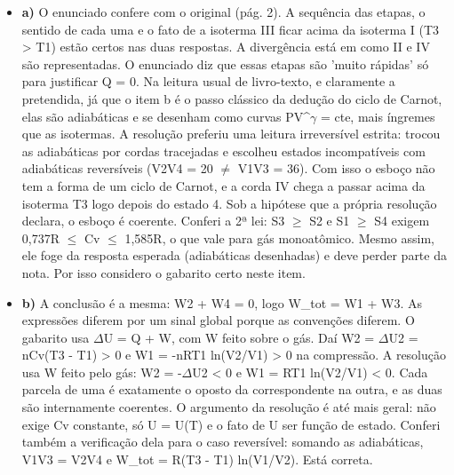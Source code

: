 \documentclass{article}%
\begin{document}
\begin{itemize}%
\item%
\textbf{a)} O enunciado confere com o original (pág. 2). A sequência das etapas, o sentido de cada uma e o fato de a isoterma III ficar acima da isoterma I (T3 > T1) estão certos nas duas respostas. A divergência está em como II e IV são representadas. O enunciado diz que essas etapas são 'muito rápidas' só para justificar Q = 0. Na leitura usual de livro{-}texto, e claramente a pretendida, já que o item b é o passo clássico da dedução do ciclo de Carnot, elas são adiabáticas e se desenham como curvas PV\^{}$\gamma$ = cte, mais íngremes que as isotermas. A resolução preferiu uma leitura irreversível estrita: trocou as adiabáticas por cordas tracejadas e escolheu estados incompatíveis com adiabáticas reversíveis (V2V4 = 20 $\neq$ V1V3 = 36). Com isso o esboço não tem a forma de um ciclo de Carnot, e a corda IV chega a passar acima da isoterma T3 logo depois do estado 4. Sob a hipótese que a própria resolução declara, o esboço é coerente. Conferi a 2ª lei: S3 $\geq$ S2 e S1 $\geq$ S4 exigem 0,737R $\leq$ Cv $\leq$ 1,585R, o que vale para gás monoatômico. Mesmo assim, ele foge da resposta esperada (adiabáticas desenhadas) e deve perder parte da nota. Por isso considero o gabarito certo neste item.%
\item%
\textbf{b)} A conclusão é a mesma: W2 + W4 = 0, logo W\_tot = W1 + W3. As expressões diferem por um sinal global porque as convenções diferem. O gabarito usa $\Delta$U = Q + W, com W feito sobre o gás. Daí W2 = $\Delta$U2 = nCv(T3 - T1) > 0 e W1 = -nRT1 ln(V2/V1) > 0 na compressão. A resolução usa W feito pelo gás: W2 = -$\Delta$U2 < 0 e W1 = RT1 ln(V2/V1) < 0. Cada parcela de uma é exatamente o oposto da correspondente na outra, e as duas são internamente coerentes. O argumento da resolução é até mais geral: não exige Cv constante, só U = U(T) e o fato de U ser função de estado. Conferi também a verificação dela para o caso reversível: somando as adiabáticas, V1V3 = V2V4 e W\_tot = R(T3 - T1) ln(V1/V2). Está correta.%
\end{itemize}%
\end{document}
